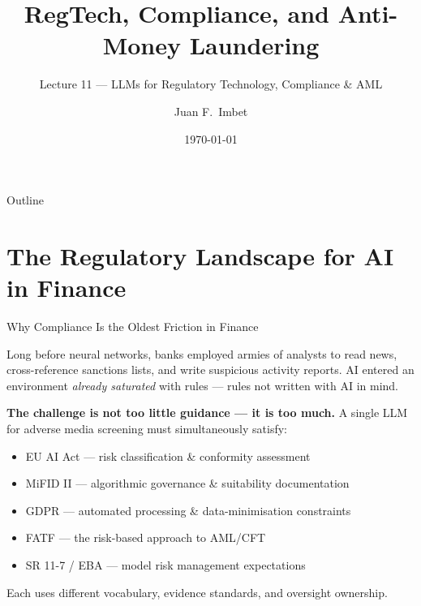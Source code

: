 \documentclass[9pt,t]{beamer}
\title{RegTech, Compliance, and Anti-Money Laundering}
\subtitle{Lecture 11 --- LLMs for Regulatory Technology, Compliance \& AML}
\author{Juan F.\ Imbet}
\institute{Paris Dauphine -- PSL University}
\date{\today}
\begin{document}
\begin{frame}\titlepage\end{frame}

\begin{frame}{Outline}\tableofcontents\end{frame}

\section{The Regulatory Landscape for AI in Finance}

\begin{frame}{Why Compliance Is the Oldest Friction in Finance}
\begin{bigpicture}
Long before neural networks, banks employed armies of analysts to read news,
cross-reference sanctions lists, and write suspicious activity reports. AI
entered an environment \emph{already saturated} with rules --- rules not written
with AI in mind.
\end{bigpicture}

\medskip
\textbf{The challenge is not too little guidance --- it is too much.} A single
LLM for adverse media screening must simultaneously satisfy:
\begin{itemize}
  \item EU AI Act --- risk classification \& conformity assessment
  \item MiFID II --- algorithmic governance \& suitability documentation
  \item GDPR --- automated processing \& data-minimisation constraints
  \item FATF --- the risk-based approach to AML/CFT
  \item SR 11-7 / EBA --- model risk management expectations
\end{itemize}
Each uses different vocabulary, evidence standards, and oversight ownership.
\end{frame}
\end{document}
